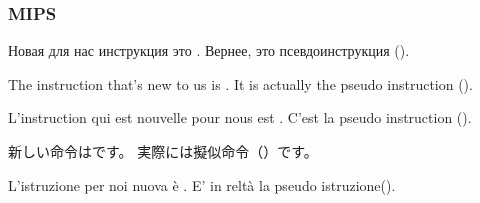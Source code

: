 ﻿\subsubsection{MIPS}

\ifdefined\RUSSIAN


Новая для нас инструкция это . Вернее, это псевдоинструкция ().
\fi

\ifdefined\ENGLISH


The instruction that's new to us is . It is actually the pseudo instruction ().
\fi

\ifdefined\FRENCH


L'instruction qui est nouvelle pour nous est . C'est la pseudo instruction ().
\fi

\ifdefined\JAPANESE


新しい命令はです。 実際には擬似命令（）です。
\fi

\ifdefined\ITALIAN


L'istruzione per noi nuova è . E' in reltà la pseudo istruzione().
